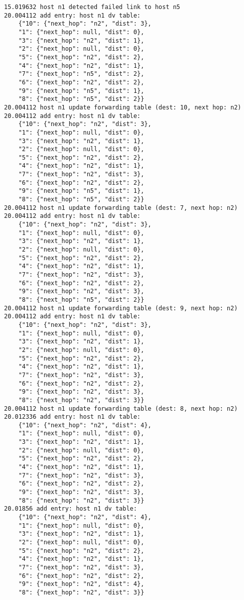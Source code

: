 \documentclass[11pt]{article}
\begin{document}
\begin{lstlisting}
15.019632 host n1 detected failed link to host n5
20.004112 add entry: host n1 dv table:
	{"10": {"next_hop": "n2", "dist": 3},
	"1": {"next_hop": null, "dist": 0},
	"3": {"next_hop": "n2", "dist": 1},
	"2": {"next_hop": null, "dist": 0},
	"5": {"next_hop": "n2", "dist": 2},
	"4": {"next_hop": "n2", "dist": 1},
	"7": {"next_hop": "n5", "dist": 2},
	"6": {"next_hop": "n2", "dist": 2},
	"9": {"next_hop": "n5", "dist": 1},
	"8": {"next_hop": "n5", "dist": 2}}
20.004112 host n1 update forwarding table (dest: 10, next hop: n2)
20.004112 add entry: host n1 dv table:
	{"10": {"next_hop": "n2", "dist": 3},
	"1": {"next_hop": null, "dist": 0},
	"3": {"next_hop": "n2", "dist": 1},
	"2": {"next_hop": null, "dist": 0},
	"5": {"next_hop": "n2", "dist": 2},
	"4": {"next_hop": "n2", "dist": 1},
	"7": {"next_hop": "n2", "dist": 3},
	"6": {"next_hop": "n2", "dist": 2},
	"9": {"next_hop": "n5", "dist": 1},
	"8": {"next_hop": "n5", "dist": 2}}
20.004112 host n1 update forwarding table (dest: 7, next hop: n2)
20.004112 add entry: host n1 dv table:
	{"10": {"next_hop": "n2", "dist": 3},
	"1": {"next_hop": null, "dist": 0},
	"3": {"next_hop": "n2", "dist": 1},
	"2": {"next_hop": null, "dist": 0},
	"5": {"next_hop": "n2", "dist": 2},
	"4": {"next_hop": "n2", "dist": 1},
	"7": {"next_hop": "n2", "dist": 3},
	"6": {"next_hop": "n2", "dist": 2},
	"9": {"next_hop": "n2", "dist": 3},
	"8": {"next_hop": "n5", "dist": 2}}
20.004112 host n1 update forwarding table (dest: 9, next hop: n2)
20.004112 add entry: host n1 dv table:
	{"10": {"next_hop": "n2", "dist": 3},
	"1": {"next_hop": null, "dist": 0},
	"3": {"next_hop": "n2", "dist": 1},
	"2": {"next_hop": null, "dist": 0},
	"5": {"next_hop": "n2", "dist": 2},
	"4": {"next_hop": "n2", "dist": 1},
	"7": {"next_hop": "n2", "dist": 3},
	"6": {"next_hop": "n2", "dist": 2},
	"9": {"next_hop": "n2", "dist": 3},
	"8": {"next_hop": "n2", "dist": 3}}
20.004112 host n1 update forwarding table (dest: 8, next hop: n2)
20.012336 add entry: host n1 dv table:
	{"10": {"next_hop": "n2", "dist": 4},
	"1": {"next_hop": null, "dist": 0},
	"3": {"next_hop": "n2", "dist": 1},
	"2": {"next_hop": null, "dist": 0},
	"5": {"next_hop": "n2", "dist": 2},
	"4": {"next_hop": "n2", "dist": 1},
	"7": {"next_hop": "n2", "dist": 3},
	"6": {"next_hop": "n2", "dist": 2},
	"9": {"next_hop": "n2", "dist": 3},
	"8": {"next_hop": "n2", "dist": 3}}
20.01856 add entry: host n1 dv table:
	{"10": {"next_hop": "n2", "dist": 4},
	"1": {"next_hop": null, "dist": 0},
	"3": {"next_hop": "n2", "dist": 1},
	"2": {"next_hop": null, "dist": 0},
	"5": {"next_hop": "n2", "dist": 2},
	"4": {"next_hop": "n2", "dist": 1},
	"7": {"next_hop": "n2", "dist": 3},
	"6": {"next_hop": "n2", "dist": 2},
	"9": {"next_hop": "n2", "dist": 4},
	"8": {"next_hop": "n2", "dist": 3}}
\end{lstlisting}
\end{document}
